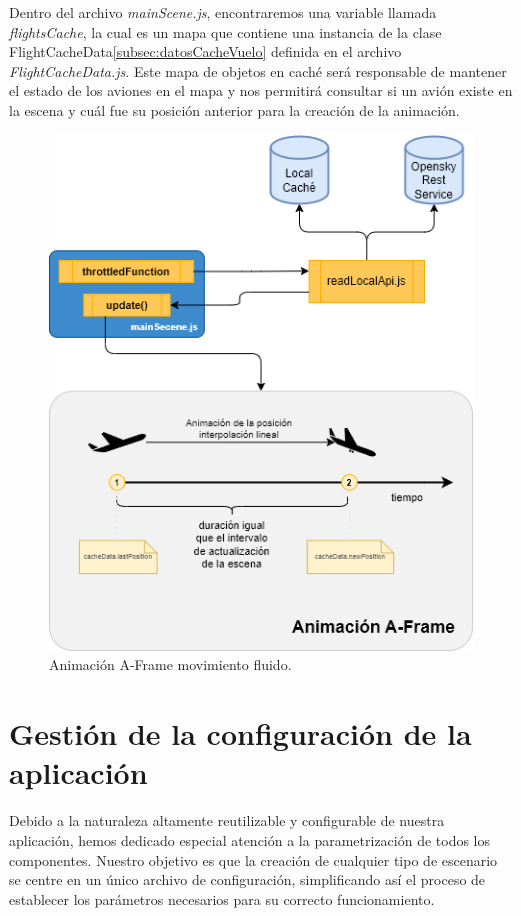 \documentclass[a4paper, 11pt]{book}
\begin{document}
Dentro del archivo \emph{mainScene.js}, encontraremos una variable llamada \emph{flightsCache}, la cual es un mapa que contiene una instancia de la clase FlightCacheData\ref{subsec:datosCacheVuelo} definida en el archivo \emph{FlightCacheData.js}. Este mapa de objetos en caché será responsable de mantener el estado de los aviones en el mapa y nos permitirá consultar si un avión existe en la escena y cuál fue su posición anterior para la creación de la animación.
\begin{figure}[h]
	\centering
	\includegraphics[width=12cm, keepaspectratio]{img/movimientoFluido.drawio.png}
	\caption{Animación A-Frame movimiento fluido.}
	\label{fig:movimientoFluido}
\end{figure}


\clearpage
\section{Gestión de la configuración de la aplicación}
\label{sec:configuration}
Debido a la naturaleza altamente reutilizable y configurable de nuestra aplicación, hemos dedicado especial atención a la parametrización de todos los componentes. Nuestro objetivo es que la creación de cualquier tipo de escenario se centre en un único archivo de configuración, simplificando así el proceso de establecer los parámetros necesarios para su correcto funcionamiento.
\end{document}
